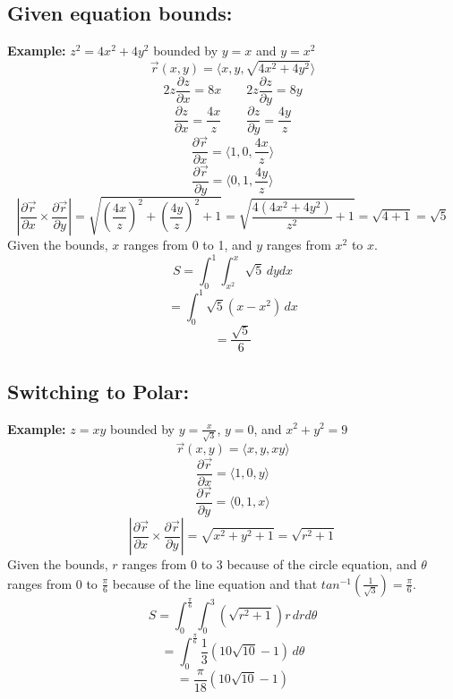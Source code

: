 \documentclass{article}
\begin{document}
\subsection{Given equation bounds:}
\textbf{Example: }$z^2=4x^2+4y^2$ bounded by $y=x$ and $y=x^2$
\[
\vec{r}(x, y)=\langle x, y, \sqrt{4x^2+4y^2} \rangle
\]
\[
2z\frac{\partial z}{\partial x}=8x \qquad 2z\frac{\partial z}{\partial y}=8y
\]
\[
\frac{\partial z}{\partial x}=\frac{4x}{z} \qquad \frac{\partial z}{\partial y}=\frac{4y}{z}
\]
\[
\frac{\partial \vec{r}}{\partial x}=\langle 1, 0, \frac{4x}{z} \rangle
\]
\[
\frac{\partial \vec{r}}{\partial y}=\langle 0, 1, \frac{4y}{z} \rangle
\]
\[
\left|\frac{\partial \vec{r}}{\partial x} \times \frac{\partial \vec{r}}{\partial y}\right|=\sqrt{\left(\frac{4x}{z}\right)^2+\left(\frac{4y}{z}\right)^2+1}=\sqrt{\frac{4(4x^2+4y^2)}{z^2}+1}=\sqrt{4+1}=\sqrt{5}
\]
Given the bounds, $x$ ranges from 0 to 1, and $y$ ranges from $x^2$ to $x$.
\[
S=\int_{0}^{1} \int_{x^2}^{x} \sqrt{5}\, dydx
\]
\[
=\int_{0}^{1} \sqrt{5}(x-x^2)\, dx
\]
\[
=\frac{\sqrt{5}}{6}
\]

\subsection{Switching to Polar:}
\textbf{Example: }$z=xy$ bounded by $y=\frac{x}{\sqrt{3}}$, $y=0$, and $x^2+y^2=9$
\[
\vec{r}(x,y)=\langle x, y, xy \rangle
\]
\[
\frac{\partial \vec{r}}{\partial x}=\langle 1, 0, y \rangle
\]
\[
\frac{\partial \vec{r}}{\partial y}=\langle 0, 1, x \rangle
\]
\[
\left|\frac{\partial \vec{r}}{\partial x} \times \frac{\partial \vec{r}}{\partial y}\right|=\sqrt{x^2+y^2+1}=\sqrt{r^2+1}
\]
Given the bounds, $r$ ranges from 0 to 3 because of the circle equation, and $\theta$ ranges from 0 to $\frac{\pi}{6}$ because of the line equation and that $tan^{-1}(\frac{1}{\sqrt{3}})=\frac{\pi}{6}$.
\[
S=\int_{0}^{\frac{\pi}{6}} \int_{0}^{3} (\sqrt{r^2+1})r\, drd\theta
\]
\[
=\int_{0}^{\frac{\pi}{6}} \frac{1}{3}(10\sqrt{10}-1)\, d\theta
\]
\[
=\frac{\pi}{18}(10\sqrt{10}-1)
\]
\end{document}
